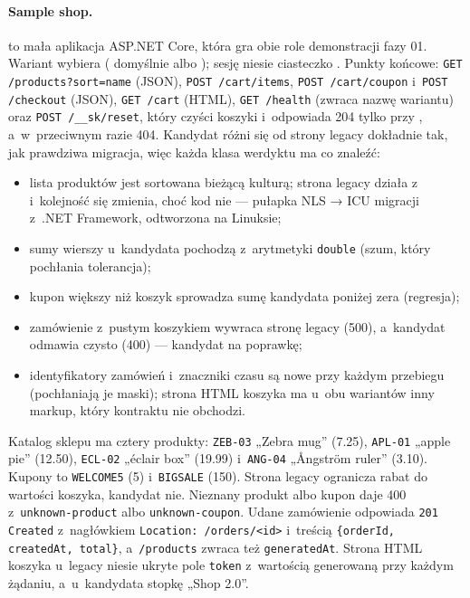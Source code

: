 \paragraph{Sample shop.}  to mała aplikacja ASP.NET Core, która gra
obie role demonstracji fazy 01. Wariant wybiera 
( domyślnie albo ); sesję niesie ciasteczko
. Punkty końcowe: \texttt{GET /products?sort=name} (JSON),
\texttt{POST /cart/items}, \texttt{POST /cart/coupon} i~\texttt{POST /checkout} (JSON),
\texttt{GET /cart} (HTML), \texttt{GET /health} (zwraca nazwę wariantu) oraz
\texttt{POST /\_\_sk/reset}, który czyści koszyki i~odpowiada 204 tylko przy
, a~w~przeciwnym razie 404. Kandydat różni się od strony
legacy dokładnie tak, jak prawdziwa migracja, więc każda klasa werdyktu ma co znaleźć:

\begin{itemize}
  \item lista produktów jest sortowana bieżącą kulturą; strona legacy działa z~ i~kolejność się zmienia, choć kod
        nie --- pułapka NLS → ICU migracji z~.NET Framework, odtworzona na Linuksie;
  \item sumy wierszy u~kandydata pochodzą z~arytmetyki \texttt{double} (szum, który pochłania
        tolerancja);
  \item kupon większy niż koszyk sprowadza sumę kandydata poniżej zera (regresja);
  \item zamówienie z~pustym koszykiem wywraca stronę legacy (500), a~kandydat odmawia czysto
        (400) --- kandydat na poprawkę;
  \item identyfikatory zamówień i~znaczniki czasu są nowe przy każdym przebiegu (pochłaniają
        je maski); strona HTML koszyka ma u~obu wariantów inny markup, który kontraktu nie
        obchodzi.
\end{itemize}

Katalog sklepu ma cztery produkty: \texttt{ZEB-03} „Zebra mug” (7.25), \texttt{APL-01}
„apple pie” (12.50), \texttt{ECL-02} „éclair box” (19.99) i~\texttt{ANG-04} „Ångström
ruler” (3.10). Kupony to \texttt{WELCOME5} (5) i~\texttt{BIGSALE} (150). Strona legacy
ogranicza rabat do wartości koszyka, kandydat nie. Nieznany produkt albo kupon daje 400
z~\texttt{unknown-product} albo \texttt{unknown-coupon}. Udane zamówienie odpowiada
\texttt{201 Created} z~nagłówkiem \texttt{Location: /orders/<id>} i~treścią
\texttt{\{orderId, createdAt, total\}}, a~\texttt{/products} zwraca też \texttt{generatedAt}.
Strona HTML koszyka u~legacy niesie ukryte pole \texttt{token} z~wartością generowaną przy
każdym żądaniu, a~u~kandydata stopkę „Shop 2.0”.

